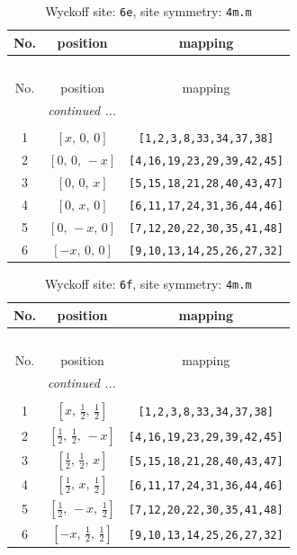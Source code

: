 \documentclass[fleqn,8pt]{jsarticle}
\begin{document}
\renewcommand{\arraystretch}{1.2}
\begin{longtable}{ccc}
\caption{Wyckoff site: {\tt 6e}, site symmetry: {\tt 4m.m}}
 \\
 \hline \hline
No. & position & mapping \\ \hline \endfirsthead

\multicolumn{2}{l}{\tablename\ \thetable{}} \\
 \hline \hline
No. & position & mapping \\ \hline \endhead

 \hline \hline
\multicolumn{2}{r}{\footnotesize\it continued ...} \\ \endfoot

 \hline \hline
\multicolumn{2}{r}{} \\ \endlastfoot

1 & $\left[ x,\, 0,\, 0 \right]$ & {\tt [1,2,3,8,33,34,37,38]} \\ \hline
2 & $\left[ 0,\, 0,\, - x \right]$ & {\tt [4,16,19,23,29,39,42,45]} \\ \hline
3 & $\left[ 0,\, 0,\, x \right]$ & {\tt [5,15,18,21,28,40,43,47]} \\ \hline
4 & $\left[ 0,\, x,\, 0 \right]$ & {\tt [6,11,17,24,31,36,44,46]} \\ \hline
5 & $\left[ 0,\, - x,\, 0 \right]$ & {\tt [7,12,20,22,30,35,41,48]} \\ \hline
6 & $\left[ - x,\, 0,\, 0 \right]$ & {\tt [9,10,13,14,25,26,27,32]} \\
\end{longtable}
\renewcommand{\arraystretch}{1.2}
\begin{longtable}{ccc}
\caption{Wyckoff site: {\tt 6f}, site symmetry: {\tt 4m.m}}
 \\
 \hline \hline
No. & position & mapping \\ \hline \endfirsthead

\multicolumn{2}{l}{\tablename\ \thetable{}} \\
 \hline \hline
No. & position & mapping \\ \hline \endhead

 \hline \hline
\multicolumn{2}{r}{\footnotesize\it continued ...} \\ \endfoot

 \hline \hline
\multicolumn{2}{r}{} \\ \endlastfoot

1 & $\left[ x,\, \frac{1}{2},\, \frac{1}{2} \right]$ & {\tt [1,2,3,8,33,34,37,38]} \\ \hline
2 & $\left[ \frac{1}{2},\, \frac{1}{2},\, - x \right]$ & {\tt [4,16,19,23,29,39,42,45]} \\ \hline
3 & $\left[ \frac{1}{2},\, \frac{1}{2},\, x \right]$ & {\tt [5,15,18,21,28,40,43,47]} \\ \hline
4 & $\left[ \frac{1}{2},\, x,\, \frac{1}{2} \right]$ & {\tt [6,11,17,24,31,36,44,46]} \\ \hline
5 & $\left[ \frac{1}{2},\, - x,\, \frac{1}{2} \right]$ & {\tt [7,12,20,22,30,35,41,48]} \\ \hline
6 & $\left[ - x,\, \frac{1}{2},\, \frac{1}{2} \right]$ & {\tt [9,10,13,14,25,26,27,32]} \\
\end{longtable}
\end{document}
